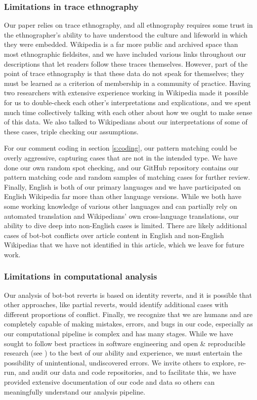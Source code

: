 \documentclass[format=acmsmall, review=false, screen=true]{acmart}%
\begin{document}
\subsubsection{Limitations in trace ethnography}
Our paper relies on trace ethnography, and all ethnography requires some trust in the ethnographer's ability to have understood the culture and lifeworld in which they were embedded. Wikipedia is a far more public and archived space than most ethnographic fieldsites, and we have included various links throughout our descriptions that let readers follow these traces themselves. However, part of the point of trace ethnography is that these data do not speak for themselves; they must be learned as a criterion of membership in a community of practice. Having two researchers with extensive experience working in Wikipedia made it possible for us to double-check each other's interpretations and explications, and we spent much time collectively talking with each other about how we ought to make sense of this data. We also talked to Wikipedians about our interpretations of some of these cases, triple checking our assumptions. 

For our comment coding in section \ref{s:coding}, our pattern matching could be overly aggressive, capturing cases that are not in the intended type. We have done our own random spot checking, and our GitHub repository contains our pattern matching code and random samples of matching cases for further review. Finally, English is both of our primary languages and we have participated on English Wikipedia far more than other language versions. While we both have some working knowledge of various other languages and can partially rely on automated translation and Wikipedians' own cross-language translations, our ability to dive deep into non-English cases is limited. There are likely additional cases of bot-bot conflicts over article content in English and non-English Wikipedias that we have not identified in this article, which we leave for future work.

\subsubsection{Limitations in computational analysis}
Our analysis of bot-bot reverts is based on identity reverts, and it is possible that other approaches, like partial reverts, would identify additional cases with different proportions of conflict.  Finally, we recognize that we are humans and are completely capable of making mistakes, errors, and bugs in our code, especially as our computational pipeline is complex and has many stages. While we have sought to follow best practices in software engineering and open \& reproducible research (see \citep{repro}) to the best of our ability and experience, we must entertain the possibility of unintentional, undiscovered errors. We invite others to explore, re-run, and audit our data and code repositories, and to facilitate this, we have provided extensive documentation of our code and data so others can meaningfully understand our analysis pipeline.
\end{document}
